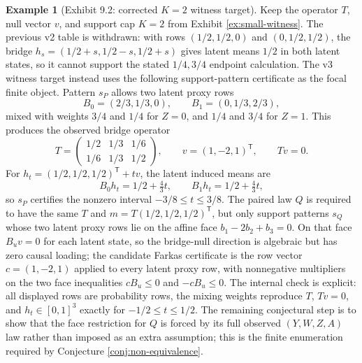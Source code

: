 \documentclass[11pt]{article}
\newcommand{\transpose}{\mathsf{T}}
\theoremstyle{definition}
\newtheorem{example}{Example}
\theoremstyle{plain}
\theoremstyle{remark}
\begin{document}
\begin{example}[Exhibit 9.2: corrected \(K=2\) witness target]\label{ex:two-laws}
Keep the operator \(T\), null vector \(v\), and support cap \(K=2\) from Exhibit \ref{ex:small-witness}. The previous v2 table is withdrawn: with rows \((1/2,1/2,0)\) and \((0,1/2,1/2)\), the bridge \(h_s=(1/2+s,1/2-s,1/2+s)\) gives latent means \(1/2\) in both latent states, so it cannot support the stated \(1/4,3/4\) endpoint calculation. The v3 witness target instead uses the following support-pattern certificate as the focal finite object. Pattern \(s_P\) allows two latent proxy rows
\[
B_0=(2/3,1/3,0),\qquad B_1=(0,1/3,2/3),
\]
mixed with weights \(3/4\) and \(1/4\) for \(Z=0\), and \(1/4\) and \(3/4\) for \(Z=1\). This produces the observed bridge operator
\[
T=\begin{pmatrix}1/2&1/3&1/6\\[2pt]1/6&1/3&1/2\end{pmatrix},
\qquad v=(1,-2,1)^\transpose,\qquad Tv=0.
\]
For \(h_t=(1/2,1/2,1/2)^\transpose+t v\), the latent induced means are
\[
B_0h_t=1/2+\tfrac{4}{3}t,\qquad B_1h_t=1/2+\tfrac{4}{3}t,
\]
so \(s_P\) certifies the nonzero interval \(-3/8\le t\le3/8\). The paired law \(Q\) is required to have the same \(T\) and \(m=T(1/2,1/2,1/2)^\transpose\), but only support patterns \(s_Q\) whose two latent proxy rows lie on the affine face \(b_1-2b_2+b_3=0\). On that face \(B_u v=0\) for each latent state, so the bridge-null direction is algebraic but has zero causal loading; the candidate Farkas certificate is the row vector \(c=(1,-2,1)\) applied to every latent proxy row, with nonnegative multipliers on the two face inequalities \(cB_u\le0\) and \(-cB_u\le0\). The internal check is explicit: all displayed rows are probability rows, the mixing weights reproduce \(T\), \(Tv=0\), and \(h_t\in[0,1]^3\) exactly for \(-1/2\le t\le1/2\). The remaining conjectural step is to show that the face restriction for \(Q\) is forced by its full observed \((Y,W,Z,A)\) law rather than imposed as an extra assumption; this is the finite enumeration required by Conjecture \ref{conj:non-equivalence}.
\end{example}
\end{document}
